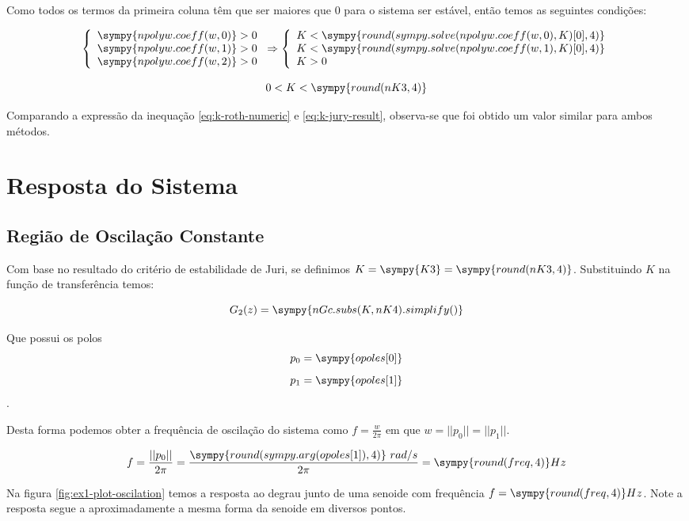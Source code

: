 \documentclass[a4paper,11pt]{article}
\newcommand{\npy}[1]{\sympy{round(#1,4)}}
\begin{document}
Como todos os termos da primeira coluna têm que ser maiores que $0$ para o sistema ser estável, então temos as seguintes condições:

$$
\left\{\begin{array}{l}
 \sympy{npolyw.coeff(w,0)} > 0\\
 \sympy{npolyw.coeff(w,1)} > 0\\
 \sympy{npolyw.coeff(w,2)} > 0
\end{array}
\right.
\Rightarrow
\left\{\begin{array}{l}
 K < \npy{sympy.solve(npolyw.coeff(w,0),K)[0]}\\
 K < \npy{sympy.solve(npolyw.coeff(w,1),K)[0]}\\
 K > 0
\end{array}
\right.
$$

\begin{equation}\label{eq:k-roth-numeric}
    0 < K < \npy{nK3}
\end{equation}

Comparando a expressão da inequação \ref{eq:k-roth-numeric} e \ref{eq:k-jury-result}, observa-se que foi obtido um valor similar para ambos métodos.

\section{Resposta do Sistema}

\subsection{Região de Oscilação Constante}

Com base no resultado do critério de estabilidade de Juri, se definimos $K = \sympy{K3}= \npy{nK3}$. Substituindo $K$ na função de transferência temos:

\begin{equation}\label{eq:closedloop-sys-oscilation}
    G_{2}(z) = \sympy{nGc.subs(K,nK4).simplify()}
\end{equation}

Que possui os polos 
$$p_0 = \sympy{opoles[0]}$$
$$p_1 = \sympy{opoles[1]}$$.

Desta forma podemos obter a frequência de oscilação do sistema como $f = \frac{w}{2\pi}$ em que $w = ||p_0|| = ||p_1||$.

$$f = \frac{||p_0||}{2\pi} = \frac{\npy{sympy.arg(opoles[1])}\ rad/s}{2\pi} = \npy{freq} Hz$$

Na figura \ref{fig:ex1-plot-oscilation} temos a resposta ao degrau junto de uma senoide com frequência $f = \npy{freq} Hz$. Note a resposta segue a aproximadamente a mesma forma da senoide em diversos pontos.
\end{document}
